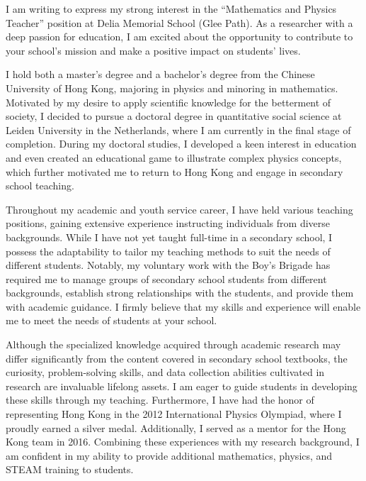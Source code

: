 \documentclass[11pt, a4paper]{awesome-cv}
\begin{document}
\makecvheader[R]

\makecvfooter
  {}%
  {}%
  {}

\makelettertitle

\begin{cvletter}

I am writing to express my strong interest in the ``Mathematics and Physics Teacher'' position at Delia Memorial School (Glee Path). As a researcher with a deep passion for education, I am excited about the opportunity to contribute to your school's mission and make a positive impact on students' lives.

I hold both a master's degree and a bachelor's degree from the Chinese University of Hong Kong, majoring in physics and minoring in mathematics. Motivated by my desire to apply scientific knowledge for the betterment of society, I decided to pursue a doctoral degree in quantitative social science at Leiden University in the Netherlands, where I am currently in the final stage of completion. During my doctoral studies, I developed a keen interest in education and even created an educational game to illustrate complex physics concepts, which further motivated me to return to Hong Kong and engage in secondary school teaching.

Throughout my academic and youth service career, I have held various teaching positions, gaining extensive experience instructing individuals from diverse backgrounds. While I have not yet taught full-time in a secondary school, I possess the adaptability to tailor my teaching methods to suit the needs of different students. Notably, my voluntary work with the Boy's Brigade has required me to manage groups of secondary school students from different backgrounds, establish strong relationships with the students, and provide them with academic guidance. I firmly believe that my skills and experience will enable me to meet the needs of students at your school.

Although the specialized knowledge acquired through academic research may differ significantly from the content covered in secondary school textbooks, the curiosity, problem-solving skills, and data collection abilities cultivated in research are invaluable lifelong assets. I am eager to guide students in developing these skills through my teaching. Furthermore, I have had the honor of representing Hong Kong in the 2012 International Physics Olympiad, where I proudly earned a silver medal. Additionally, I served as a mentor for the Hong Kong team in 2016. Combining these experiences with my research background, I am confident in my ability to provide additional mathematics, physics, and STEAM training to students.


\end{cvletter}
\end{document}
